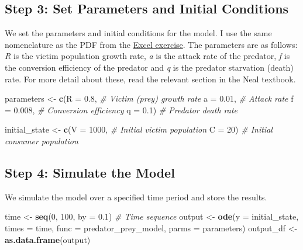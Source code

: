 \documentclass[
  a4paper]{book}
\newenvironment{Shaded}{\begin{snugshade}}{\end{snugshade}}
\newcommand{\AttributeTok}[1]{\textcolor[rgb]{0.13,0.29,0.53}{#1}}
\newcommand{\CommentTok}[1]{\textcolor[rgb]{0.56,0.35,0.01}{\textit{#1}}}
\newcommand{\DecValTok}[1]{\textcolor[rgb]{0.00,0.00,0.81}{#1}}
\newcommand{\FloatTok}[1]{\textcolor[rgb]{0.00,0.00,0.81}{#1}}
\newcommand{\FunctionTok}[1]{\textcolor[rgb]{0.13,0.29,0.53}{\textbf{#1}}}
\newcommand{\NormalTok}[1]{#1}
\newcommand{\OtherTok}[1]{\textcolor[rgb]{0.56,0.35,0.01}{#1}}
\begin{document}
\subsection{Step 3: Set Parameters and Initial Conditions}\label{step-3-set-parameters-and-initial-conditions}

We set the parameters and initial conditions for the model. I use the same nomenclature as the PDF from the \href{https://jonesor.github.io/BB512_Book/lotka-volterra-predator-prey-dynamics.html}{Excel exercise}. The parameters are as follows: \emph{R} is the victim population growth rate, \emph{a} is the attack rate of the predator, \emph{f} is the conversion efficiency of the predator and \emph{q} is the predator starvation (death) rate. For more detail about these, read the relevant section in the Neal textbook.

\begin{Shaded}
\begin{Highlighting}[]
\NormalTok{parameters }\OtherTok{\textless{}{-}} \FunctionTok{c}\NormalTok{(}\AttributeTok{R =} \FloatTok{0.8}\NormalTok{,  }\CommentTok{\# Victim (prey) growth rate}
                \AttributeTok{a =} \FloatTok{0.01}\NormalTok{, }\CommentTok{\# Attack rate}
                \AttributeTok{f =} \FloatTok{0.008}\NormalTok{, }\CommentTok{\# Conversion efficiency}
                \AttributeTok{q =} \FloatTok{0.1}\NormalTok{)  }\CommentTok{\# Predator death rate}

\NormalTok{initial\_state }\OtherTok{\textless{}{-}} \FunctionTok{c}\NormalTok{(}\AttributeTok{V =} \DecValTok{1000}\NormalTok{,  }\CommentTok{\# Initial victim population}
                   \AttributeTok{C =} \DecValTok{20}\NormalTok{)   }\CommentTok{\# Initial consumer population}
\end{Highlighting}
\end{Shaded}

\subsection{Step 4: Simulate the Model}\label{step-4-simulate-the-model}

We simulate the model over a specified time period and store the results.

\begin{Shaded}
\begin{Highlighting}[]
\NormalTok{time }\OtherTok{\textless{}{-}} \FunctionTok{seq}\NormalTok{(}\DecValTok{0}\NormalTok{, }\DecValTok{100}\NormalTok{, }\AttributeTok{by =} \FloatTok{0.1}\NormalTok{)  }\CommentTok{\# Time sequence}
\NormalTok{output }\OtherTok{\textless{}{-}} \FunctionTok{ode}\NormalTok{(}\AttributeTok{y =}\NormalTok{ initial\_state, }\AttributeTok{times =}\NormalTok{ time, }\AttributeTok{func =}\NormalTok{ predator\_prey\_model, }\AttributeTok{parms =}\NormalTok{ parameters)}
\NormalTok{output\_df }\OtherTok{\textless{}{-}} \FunctionTok{as.data.frame}\NormalTok{(output)}
\end{Highlighting}
\end{Shaded}
\end{document}
